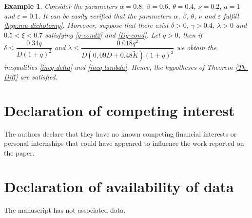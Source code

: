 \documentclass[9pt]{amsart}
\newtheorem{example}{Example}
\numberwithin{equation}{section}
\numberwithin{lemma}{section}
\begin{document}
\begin{example}
Consider the parameters $\alpha=0.8$, $\beta=0.6$, $\theta=0.4$, $\nu=0.2$, $a=1$ and $\varepsilon=0.1$. It can be easily verified that the parameters $\alpha$, $\beta$, $\theta$, $\nu$ and $\varepsilon$ fulfill \eqref{hyp:mu-dichotomy}. Moreover, suppose that there exist \(\delta > 0\), \(\gamma > 0.4\), \(\lambda > 0\) and \(0.5<\xi<0.7\) satisfying  \eqref{g-cond2} and \eqref{Dg-cond}. Let $q>0$, then if $\delta\leq\dfrac{0.34q}{D(1+q)^2}$ and $\lambda\leq\dfrac{0.018q^2}{D(0,09D+0.48\tilde{K})(1+q)^3}$ we obtain the inequalities  \eqref{ineq-delta} and \eqref{ineq-lambda}. Hence, the hypotheses of Theorem \ref{Th-Diff} are satisfied.
\end{example}
        

\section*{Declaration of competing interest}

The authors declare that they have no known competing financial
interests or personal internships that could have appeared to influence the work reported
on the paper.


\section*{Declaration of availability of data}

The manuscript has not associated data.
\end{document}

